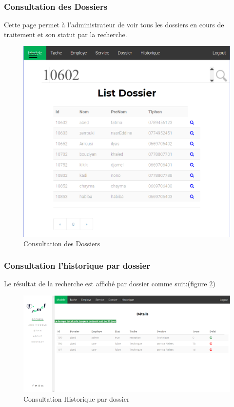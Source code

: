 \subsubsection{Consultation des  Dossiers}
Cette page permet à l'administrateur de voir tous les dossiers en cours de traitement et son statut par la recherche.
\begin{figure}[H]
	\centering
	\includegraphics[width=0.7\linewidth]{images/captures/capturesadmin/dossier}
	\caption{Consultation des  Dossiers}
	\label{fig:dossier}
\end{figure}

\subsubsection{ Consultation l'historique par dossier }
Le résultat de la recherche est affiché par dossier comme suit:(figure \ref{fig:historique})
\begin{figure}[H]
	\centering
	\includegraphics[width=1\linewidth]{images/captures/capturesadmin/historique}
	\caption{Consultation Historique par dossier }
	\label{fig:historique}
\end{figure}

